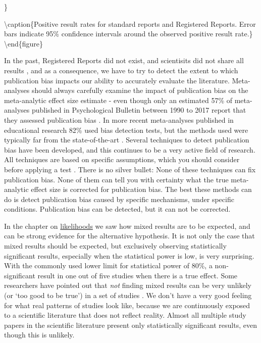 \documentclass[
  oneside]{book}
\begin{document}
\}

\textbackslash caption\{Positive result rates for standard reports and Registered Reports. Error bars indicate 95\% confidence intervals around the observed positive result rate.\}\label{fig:scheel}
\textbackslash end\{figure\}

In the past, Registered Reports did not exist, and scientisits did not share all results \citep{franco_publication_2014, greenwald_consequences_1975, sterling_publication_1959}, and as a consequence, we have to try to detect the extent to which publication bias impacts our ability to accurately evaluate the literature. Meta-analyses should always carefully examine the impact of publication bias on the meta-analytic effect size estimate - even though only an estimated 57\% of meta-analyses published in Psychological Bulletin between 1990 to 2017 report that they assessed publication bias \citep{polanin_transparency_2020}. In more recent meta-analyses published in educational research 82\% used bias detection tests, but the methods used were typically far from the state-of-the-art \citep{ropovik_neglect_2021}. Several techniques to detect publication bias have been developed, and this continues to be a very active field of research. All techniques are based on specific assumptions, which you should consider before applying a test \citep{carter_correcting_2019}. There is no silver bullet: None of these techniques can fix publication bias. None of them can tell you with certainty what the true meta-analytic effect size is corrected for publication bias. The best these methods can do is detect publication bias caused by specific mechanisms, under specific conditions. Publication bias can be detected, but it can not be corrected.

In the chapter on \protect\hyperlink{likelihoods}{likelihoods} we saw how mixed results are to be expected, and can be strong evidence for the alternative hypothesis. It is not only the case that mixed results should be expected, but exclusively observing statistically significant results, especially when the statistical power is low, is very surprising. With the commonly used lower limit for statistical power of 80\%, a non-significant result in one out of five studies when there is a true effect. Some researchers have pointed out that \emph{not} finding mixed results can be very unlikely (or `too good to be true') in a set of studies \citep{francis_frequency_2014, schimmack_ironic_2012}. We don't have a very good feeling for what real patterns of studies look like, because we are continuously exposed to a scientific literature that does not reflect reality. Almost all multiple study papers in the scientific literature present only statistically significant results, even though this is unlikely.
\end{document}
